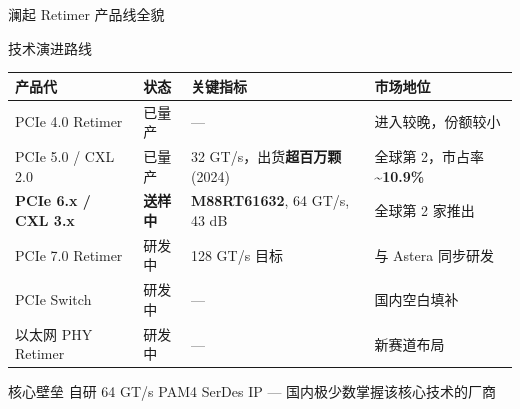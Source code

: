 \documentclass[aspectratio=169, 10pt, UTF8]{ctexbeamer}
\begin{document}
\begin{frame}{澜起 Retimer 产品线全貌}
  \begin{block}{技术演进路线}
    \centering
    \footnotesize
    \begin{tabularx}{\textwidth}{p{3.2cm} p{1.8cm} p{4.5cm} p{3.5cm}}
      \toprule
      \textbf{产品代} & \textbf{状态} & \textbf{关键指标} & \textbf{市场地位} \\
      \midrule
      PCIe 4.0 Retimer & 已量产 & — & 进入较晚，份额较小 \\
      \addlinespace
      PCIe 5.0 / CXL 2.0 & 已量产 & 32 GT/s，出货\textbf{超百万颗} (2024) & 全球第 2，市占率 \textbf{\textasciitilde10.9\%} \\
      \addlinespace
      \textbf{PCIe 6.x / CXL 3.x} & \textbf{送样中} & \textbf{M88RT61632}, 64 GT/s, 43 dB & 全球第 2 家推出 \\
      \addlinespace
      PCIe 7.0 Retimer & 研发中 & 128 GT/s 目标 & 与 Astera 同步研发 \\
      \addlinespace
      PCIe Switch & 研发中 & — & 国内空白填补 \\
      \addlinespace
      以太网 PHY Retimer & 研发中 & — & 新赛道布局 \\
      \bottomrule
    \end{tabularx}
  \end{block}

  \vspace{6pt}
  \begin{alertblock}{核心壁垒}
    自研 64 GT/s PAM4 SerDes IP — 国内极少数掌握该核心技术的厂商
  \end{alertblock}
\end{frame}
\end{document}
